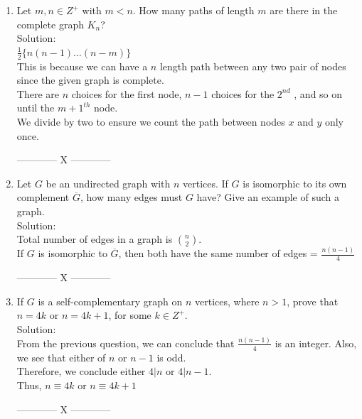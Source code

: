 \documentclass[a4paper]{article}
\begin{document}
\begin{enumerate}
\item Let $m,n \in Z^+$ with $m <n$. How many paths of length $m$ are there in the complete graph $K_n$? \\
Solution: \\
$\frac{1}{2} \{n(n-1)\dots (n-m)\}$\\
This is because we can have a $n$ length path between any two pair of nodes since the given graph is complete.\\
There are $n$ choices for the first node, $n-1$ choices for the $2^{nd}$ , and so on until the $m+1^{th}$ node. \\
We divide by two to ensure we count the path between nodes $x$ and $y$ only once. 
\begin{center}
------------ X ------------
\end{center} 





\item Let $G$ be an undirected graph with 
$n$ vertices. If $G$ is
isomorphic to its own complement $\overline{G}$, how many edges must
$G$ have? Give an example of such a graph.\\
Solution:\\

Total number of edges in a graph is $n \choose 2$.\\
If $G$ is isomorphic to $\overline{G}$, then both have the same number of edges = $\frac{n(n-1)}{4}$
\begin{center}
------------ X ------------
\end{center}



\item If $G$ is a self-complementary graph on $n$ vertices, where
$n > 1$, prove that $n = 4k$ or $n = 4k + 1$, for some $k \in Z^+$.\\
Solution: \\
From the previous question, we can conclude that $\frac{n(n-1)}{4}$ is an integer. Also, we see that either of $n$ or $n-1$ is odd.\\
Therefore, we conclude either $4|n$ or $4|n-1$. \\
Thus, $n \equiv 4k$ or $n \equiv 4k+1$
\begin{center}
------------ X ------------
\end{center}


\end{enumerate}
\end{document}
